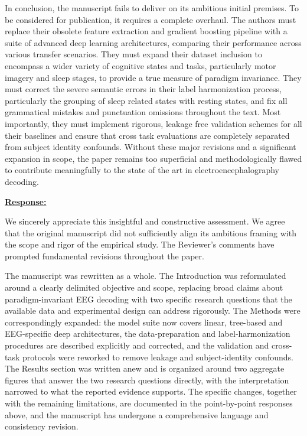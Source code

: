 \documentclass{article}
\begin{document}
\begin{cmt}{}{}

In conclusion, the manuscript fails to deliver on its ambitious initial
premises. To be considered for publication, it requires a complete overhaul. The
authors must replace their obsolete feature extraction and gradient boosting
pipeline with a suite of advanced deep learning architectures, comparing their
performance across various transfer scenarios. They must expand their dataset
inclusion to encompass a wider variety of cognitive states and tasks,
particularly motor imagery and sleep stages, to provide a true measure of
paradigm invariance. They must correct the severe semantic errors in their label
harmonization process, particularly the grouping of sleep related states with
resting states, and fix all grammatical mistakes and punctuation omissions
throughout the text. Most importantly, they must implement rigorous, leakage
free validation schemes for all their baselines and ensure that cross task
evaluations are completely separated from subject identity confounds. Without
these major revisions and a significant expansion in scope, the paper remains
too superficial and methodologically flawed to contribute meaningfully to the
state of the art in electroencephalography decoding.

\end{cmt}
\vspace{0.1cm}
\noindent
\underline{\textbf{Response:}}
\vspace{0.2cm}

We sincerely appreciate this insightful and constructive assessment. We agree
that the original manuscript did not sufficiently align its ambitious framing
with the scope and rigor of the empirical study. The Reviewer's comments have
prompted fundamental revisions throughout the paper.

The manuscript was rewritten as a whole. The Introduction was reformulated
around a clearly delimited objective and scope, replacing broad claims about
paradigm-invariant EEG decoding with two specific research questions that the
available data and experimental design can address rigorously. The Methods were
correspondingly expanded: the model suite now covers linear, tree-based and
EEG-specific deep architectures, the data-preparation and label-harmonization
procedures are described explicitly and corrected, and the validation and
cross-task protocols were reworked to remove leakage and subject-identity
confounds. The Results section was written anew and is organized around two
aggregate figures that answer the two research questions directly, with the
interpretation narrowed to what the reported evidence supports. The specific
changes, together with the remaining limitations, are documented in the
point-by-point responses above, and the manuscript has undergone a comprehensive
language and consistency revision.
\end{document}
